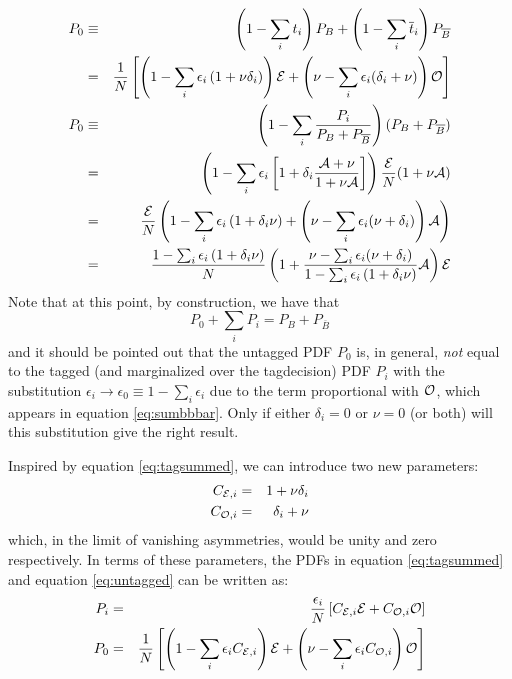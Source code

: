 \documentclass[a4paper,10pt,twosided]{article}
\begin{document}
\begin{eqnarray}
     P_0 & \equiv & \left(1-\sum_i t_i\right) P_B + \left(1-\sum_i \overline{t}_i\right) P_{\overline B}  \nonumber
\\   & = & \frac{1}{N} \left[ \left( 1-\sum_i\epsilon_i\left(1+\nu\delta_i\right) \right) {\cal E} 
                            + \left( \nu - \sum_i \epsilon_i(\delta_i+\nu)   \right) {\cal O} \right] \label{eq:untagged}
\\   P_0 & \equiv & \left( 1 - \sum_i \frac{P_i }{P_{B} + P_{\overline B}} \right)( P_{B} + P_{\overline B}) 
\\       & = & \left( 1  - \sum_i \epsilon_i\left[1 +\delta_i \frac{{\cal A}+ \nu}{1+\nu{\cal A} } \right]\right) \frac{\cal E}{N}( 1 + \nu {\cal A} ) 
\\ &=& \frac{\cal E}{N} \left(1- \sum_i \epsilon_i\left(1+\delta_i \nu \right)+ \left(\nu -\sum_i \epsilon_i (\nu+\delta_i) \right){\cal A} \right) 
\\ &=& \frac{1- \sum_i \epsilon_i\left(1+\delta_i \nu \right)}{N} \left(1 + \frac{ \nu -\sum_i \epsilon_i (\nu+\delta_i) }{ 1-\sum_i \epsilon_i\left( 1+\delta_i \nu \right) } {\cal A} \right){\cal E} 
\end{eqnarray}
Note that at this point, by construction, we have that
\begin{equation}
   P_0 + \sum_i P_i = P_{B} + P_{\overline B} 
\end{equation}
and it should be pointed out that the untagged PDF $P_0$ is, in general, {\em not} equal to the tagged (and marginalized
over the tagdecision) PDF $P_i$
with the substitution $\epsilon_i \rightarrow \epsilon_0 \equiv 1-\sum_i \epsilon_i$ due to the term proportional with ${\cal O}$, 
which appears in equation \ref{eq:sumbbbar}. Only if either $\delta_i=0$ or $\nu=0$ (or both) will this 
substitution give the right result.

Inspired by equation \ref{eq:tagsummed}, we can introduce two new parameters:
\begin{eqnarray}
    C_{{\cal E},i} &=& 1 + \nu \delta_i 
\\  C_{{\cal O},i} &=& \delta_i + \nu
\end{eqnarray}
which, in the limit of vanishing asymmetries, would be unity and zero respectively.
In terms of these parameters, the PDFs in equation \ref{eq:tagsummed} and equation \ref{eq:untagged} can be written
as:
\begin{eqnarray}
     P_i    &=&  \frac{\epsilon_i}{N} \left[ C_{{\cal E},i}{\cal E}+ C_{{\cal O},i}{\cal O} \right] \label{eq:tagsummed2} \\
     P_0    &=&  \frac{1}{N}\left[ \left(1-\sum_i \epsilon_i C_{{\cal E},i}\right) {\cal E} + \left( \nu -\sum_i \epsilon_i C_{{\cal O},i} \right) {\cal O} \right]
\end{eqnarray}
\end{document}

